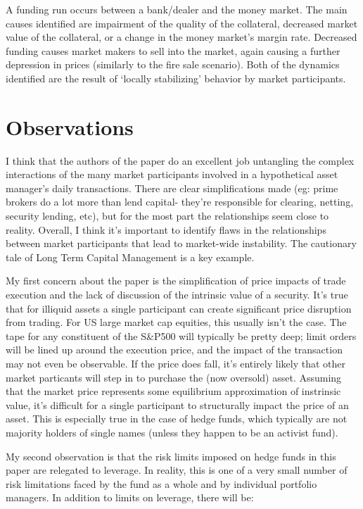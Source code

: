 \documentclass{article}
\begin{document}
A funding run occurs between a bank/dealer and the money market. The main causes identified are impairment of the quality of the collateral, decreased market value of the collateral, or a change in the money market's margin rate. Decreased funding causes market makers to sell into the market, again causing a further depression in prices (similarly to the fire sale scenario). Both of the dynamics identified are the result of `locally stabilizing' behavior by market participants.

\section{Observations}%
\label{sec:Observations}

I think that the authors of the paper do an excellent job untangling the complex interactions of the many market participants involved in a hypothetical asset manager's daily transactions. There are clear simplifications made (eg: prime brokers do a lot more than lend capital- they're responsible for clearing, netting, security lending, etc), but for the most part the relationships seem close to reality. Overall, I think it's important to identify flaws in the relationships between market
participants that lead to market-wide instability. The cautionary tale of Long Term Capital Management is a key example.

My first concern about the paper is the simplification of price impacts of trade execution and the lack of discussion of the intrinsic value of a security. It's true that for illiquid assets a single participant can create significant price disruption from trading. For US large market cap equities, this usually isn't the case. The tape for any constituent of the S\&P500 will typically be pretty deep; limit orders will be lined up around the execution price, and the impact of the
transaction may not even be observable. If the price does fall, it's entirely likely that other market particants will step in to purchase the (now oversold) asset. Assuming that the market price represents some equilibrium approximation of instrinsic value, it's difficult for a single participant to structurally impact the price of an asset. This is especially true in the case of hedge funds, which typically are not majority holders of single names (unless they happen to be an
activist fund).

My second observation is that the risk limits imposed on hedge funds in this paper are relegated to leverage. In reality, this is one of a very small number of risk limitations faced by the fund as a whole and by individual portfolio managers. In addition to limits on leverage, there will be:
\end{document}
